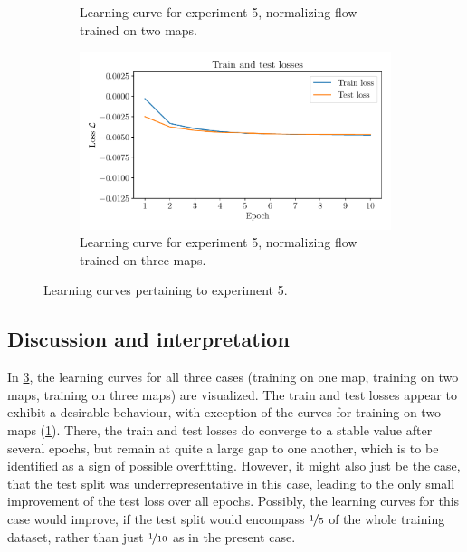 \documentclass[a4paper,12pt]{report}
\begin{document}
\begin{figure}[h]
\begin{subfigure}[t]{0.32\textwidth}
    \caption{Learning curve for experiment 5, normalizing flow trained on two maps.}
    \label{fig:nf-milne-eddington-example-5-loss-2train-nflows-piecewisequadratic}
\end{subfigure}
\hfill
\begin{subfigure}[t]{0.32\textwidth}
    \centering
    \includegraphics[width=\textwidth]{figures/nf-milne-eddington-example-5-loss-3train-nflows-piecewisequadratic.pdf}
    \caption{Learning curve for experiment 5, normalizing flow trained on three maps.}
    \label{fig:nf-milne-eddington-example-5-loss-3train-nflows-piecewisequadratic}
\end{subfigure}
\caption{Learning curves pertaining to experiment 5.}
\label{fig:nf-milne-eddington-example-5-loss-nflows-piecewisequadratic}
\end{figure}

\subsection{Discussion and interpretation}
In \cref{fig:nf-milne-eddington-example-5-loss-nflows-piecewisequadratic}, the learning curves for all three cases (training on one map, training on two maps, training on three maps) are visualized. The train and test losses appear to exhibit a desirable behaviour, with exception of the curves for training on two maps (\cref{fig:nf-milne-eddington-example-5-loss-2train-nflows-piecewisequadratic}). There, the train and test losses do converge to a stable value after several epochs, but remain at quite a large gap to one another, which is to be identified as a sign of possible overfitting. However, it might also just be the case, that the test split was underrepresentative in this case, leading to the only small improvement of the test loss over all epochs. Possibly, the learning curves for this case would improve, if the test split would encompass $\nicefrac{1}{5}$ of the whole training dataset, rather than just $\nicefrac{1}{10}$ as in the present case.
\end{document}
